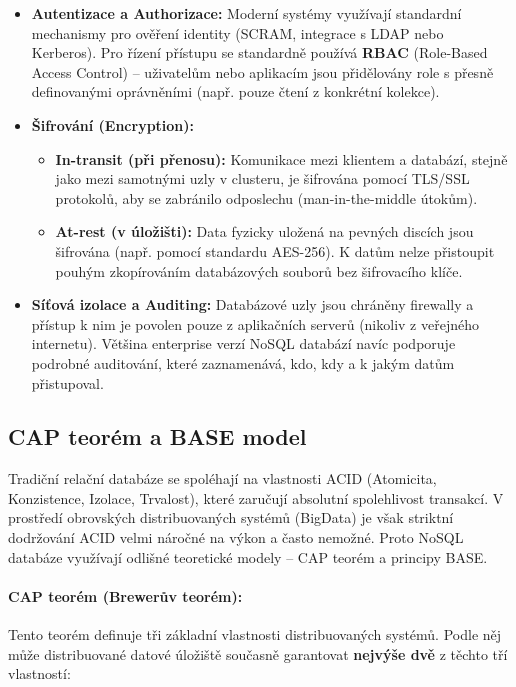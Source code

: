 \begin{itemize}
    \item \textbf{Autentizace a Authorizace:} Moderní systémy využívají standardní mechanismy pro ověření identity (SCRAM, integrace s LDAP nebo Kerberos). Pro řízení přístupu se standardně používá \textbf{RBAC} (Role-Based Access Control) -- uživatelům nebo aplikacím jsou přidělovány role s přesně definovanými oprávněními (např. pouze čtení z konkrétní kolekce).
    \item \textbf{Šifrování (Encryption):}
    \begin{itemize}
        \item \textbf{In-transit (při přenosu):} Komunikace mezi klientem a databází, stejně jako mezi samotnými uzly v clusteru, je šifrována pomocí TLS/SSL protokolů, aby se zabránilo odposlechu (man-in-the-middle útokům).
        \item \textbf{At-rest (v úložišti):} Data fyzicky uložená na pevných discích jsou šifrována (např. pomocí standardu AES-256). K datům nelze přistoupit pouhým zkopírováním databázových souborů bez šifrovacího klíče.
    \end{itemize}
    \item \textbf{Síťová izolace a Auditing:} Databázové uzly jsou chráněny firewally a přístup k nim je povolen pouze z aplikačních serverů (nikoliv z veřejného internetu). Většina enterprise verzí NoSQL databází navíc podporuje podrobné auditování, které zaznamenává, kdo, kdy a k jakým datům přistupoval.
\end{itemize}

\subsection{CAP teorém a BASE model}
Tradiční relační databáze se spoléhají na vlastnosti ACID (Atomicita, Konzistence, Izolace, Trvalost), které zaručují absolutní spolehlivost transakcí. V prostředí obrovských distribuovaných systémů (BigData) je však striktní dodržování ACID velmi náročné na výkon a často nemožné. Proto NoSQL databáze využívají odlišné teoretické modely -- CAP teorém a principy BASE.

\paragraph*{CAP teorém (Brewerův teorém):}
Tento teorém definuje tři základní vlastnosti distribuovaných systémů. Podle něj může distribuované datové úložiště současně garantovat \textbf{nejvýše dvě} z těchto tří vlastností:


